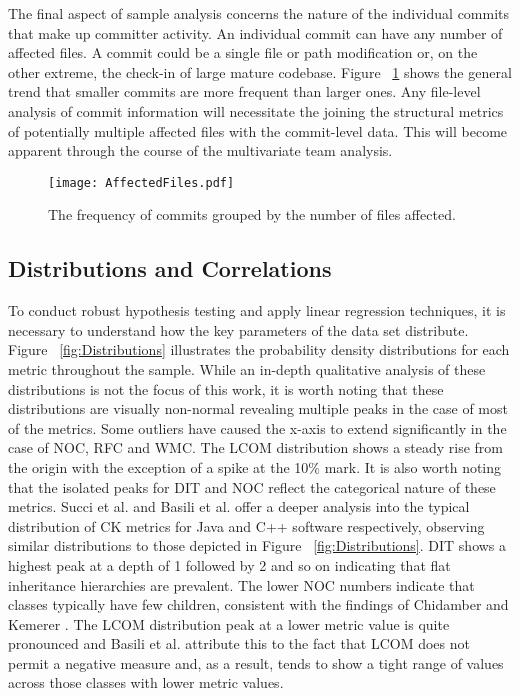 The final aspect of sample analysis concerns the nature of the individual commits that make up committer activity. An individual commit can have any number of affected files. A commit could be a single file or path modification or, on the other extreme, the check-in of large mature codebase. Figure ~\ref{fig:AffectedFiles} shows the general trend that smaller commits are more frequent than larger ones. Any file-level analysis of commit information will necessitate the joining the structural metrics of potentially multiple affected files with the commit-level data. This will become apparent through the course of the multivariate team analysis.

\begin{figure}[htbp!] 
\centering    
\texttt{[image: AffectedFiles.pdf]}
\caption{The frequency of commits grouped by the number of files affected.}
\label{fig:AffectedFiles}
\end{figure}

\subsection{Distributions and Correlations}
To conduct robust hypothesis testing and apply linear regression techniques, it is necessary to understand how the key parameters of the data set distribute. Figure ~\ref{fig:Distributions} illustrates the probability density distributions for each metric throughout the sample. While an in-depth qualitative analysis of these distributions is not the focus of this work, it is worth noting that these distributions are visually non-normal revealing multiple peaks in the case of most of the metrics. Some outliers have caused the x-axis to extend significantly in the case of NOC, RFC and WMC. The LCOM distribution shows a steady rise from the origin with the exception of a spike at the 10\% mark. It is also worth noting that the isolated peaks for DIT and NOC reflect the categorical nature of these metrics. Succi et al. \citep{succi2005empirical} and Basili et al. \citep{basili1996validation} offer a deeper analysis into the typical distribution of CK metrics for Java and C++ software respectively, observing similar distributions to those depicted in Figure ~\ref{fig:Distributions}. DIT shows a highest peak at a depth of 1 followed by 2 and so on indicating that flat inheritance hierarchies are prevalent. The lower NOC numbers indicate that classes typically have few children, consistent with the findings of Chidamber and Kemerer \citep{chidamber1994metrics}. The LCOM distribution peak at a lower metric value is quite pronounced and Basili et al. attribute this to the fact that LCOM does not permit a negative measure and, as a result, tends to show a tight range of values across those classes with lower metric values.

